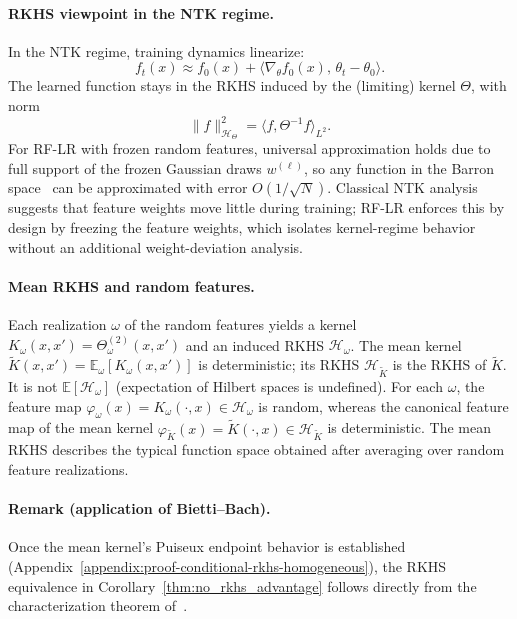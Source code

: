 \paragraph{RKHS viewpoint in the NTK regime.}
In the NTK regime, training dynamics linearize:
\[
f_t(x) \approx f_0(x) + \langle \nabla_\theta f_0(x),\, \theta_t-\theta_0 \rangle.
\]
The learned function stays in the RKHS induced by the (limiting) kernel \(\Theta\), with norm
\[
\|f\|_{\mathcal{H}_\Theta}^2 = \langle f, \Theta^{-1}f\rangle_{L^2}.
\]
For RF-LR with frozen random features, universal approximation holds due to full support of the frozen Gaussian draws \(w^{(\ell)}\), so any function in the Barron space~\cite{e2021barronspaceflowinducedfunction} can be approximated with error \(O(1/\sqrt{N})\).
Classical NTK analysis suggests that feature weights move little during training; RF-LR enforces this by design by freezing the feature weights, which isolates kernel-regime behavior without an additional weight-deviation analysis.

\paragraph{Mean RKHS and random features.}
Each realization \(\omega\) of the random features yields a kernel \(K_\omega(x,x')=\Theta^{(2)}_\omega(x,x')\) and an induced RKHS \(\mathcal{H}_\omega\). The mean kernel \(\tilde{K}(x,x')=\mathbb{E}_\omega[K_\omega(x,x')]\) is deterministic; its RKHS \(\mathcal{H}_{\tilde{K}}\) is the RKHS of \(\tilde{K}\). It is not \(\mathbb{E}[\mathcal{H}_\omega]\) (expectation of Hilbert spaces is undefined). For each \(\omega\), the feature map \(\varphi_\omega(x)=K_\omega(\cdot,x)\in\mathcal{H}_\omega\) is random, whereas the canonical feature map of the mean kernel \(\varphi_{\tilde{K}}(x)=\tilde{K}(\cdot,x)\in\mathcal{H}_{\tilde{K}}\) is deterministic. The mean RKHS describes the typical function space obtained after averaging over random feature realizations.

\paragraph{Remark (application of Bietti--Bach).}\label{appendix:rmk-bietti-bach-application}
Once the mean kernel's Puiseux endpoint behavior is established (Appendix~\ref{appendix:proof-conditional-rkhs-homogeneous}), the RKHS equivalence in Corollary~\ref{thm:no_rkhs_advantage} follows directly from the characterization theorem of~\cite{bietti2021deepequalsshallowrelu}.

